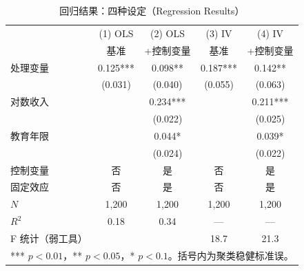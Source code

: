 \begin{table}
  \centering
  \caption{回归结果：四种设定（Regression Results）}
  {\scriptsize
  \begin{tabular}{lcccc}
    \toprule
    & (1) OLS & (2) OLS & (3) IV & (4) IV \\
    & 基准    & +控制变量 & 基准  & +控制变量 \\
    \midrule
    处理变量          & 0.125*** & 0.098**  & 0.187*** & 0.142** \\
                      & (0.031)  & (0.040)  & (0.055)  & (0.063) \\[4pt]
    对数收入          &          & 0.234*** &          & 0.211*** \\
                      &          & (0.022)  &          & (0.025) \\[4pt]
    教育年限          &          & 0.044*   &          & 0.039*  \\
                      &          & (0.024)  &          & (0.022) \\
    \midrule
    控制变量          & 否  & 是  & 否  & 是  \\
    固定效应          & 否  & 是  & 否  & 是  \\
    $N$               & 1{,}200 & 1{,}200 & 1{,}200 & 1{,}200 \\
    $R^2$             & 0.18 & 0.34 & --- & --- \\
    F 统计（弱工具）  &      &      & 18.7 & 21.3 \\
    \bottomrule
    \multicolumn{5}{l}{%
      \scriptsize
      *** $p<0.01$，** $p<0.05$，* $p<0.1$。括号内为聚类稳健标准误。}
  \end{tabular}}
\end{table}
